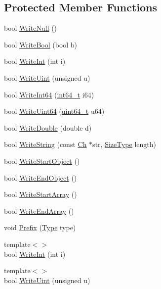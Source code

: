 \subsection*{Protected Member Functions}
\begin{DoxyCompactItemize}
\item 
bool \hyperlink{classWriter_af4f79d39ad69cbbc7976565dd257b436}{Write\+Null} ()
\item 
bool \hyperlink{classWriter_a21f1adc6a520084ed4f39522ed9f4540}{Write\+Bool} (bool b)
\item 
bool \hyperlink{classWriter_acc42b38b43ae1488fc2e779c8a333d34}{Write\+Int} (int i)
\item 
bool \hyperlink{classWriter_aa7e4196f87bfa66c9619e0efd15d16ea}{Write\+Uint} (unsigned u)
\item 
bool \hyperlink{classWriter_ad68f4e0a85cc944a0740200544c97ed9}{Write\+Int64} (\hyperlink{stdint_8h_a414156feea104f8f75b4ed9e3121b2f6}{int64\+\_\+t} i64)
\item 
bool \hyperlink{classWriter_ac3d17e9409c202e39b0cd887545783d6}{Write\+Uint64} (\hyperlink{stdint_8h_aec6fcb673ff035718c238c8c9d544c47}{uint64\+\_\+t} u64)
\item 
bool \hyperlink{classWriter_aced9cb2b88abc16c4a0bdb75920cd424}{Write\+Double} (double d)
\item 
bool \hyperlink{classWriter_aab4926d061472149998b89b4d34e1a4b}{Write\+String} (const \hyperlink{classWriter_a5ba0d623162839460024b517fc2d5868}{Ch} $\ast$str, \hyperlink{rapidjson_8h_a5ed6e6e67250fadbd041127e6386dcb5}{Size\+Type} length)
\item 
bool \hyperlink{classWriter_ad3578f94664c62e6b0773f4dc0567a17}{Write\+Start\+Object} ()
\item 
bool \hyperlink{classWriter_a9f76fcffaf403a49a311de074a23de2d}{Write\+End\+Object} ()
\item 
bool \hyperlink{classWriter_af3804bde535cf36e0733c07a56742111}{Write\+Start\+Array} ()
\item 
bool \hyperlink{classWriter_a9d7ec17cfb0b64a88c009871ba741f52}{Write\+End\+Array} ()
\item 
void \hyperlink{classWriter_ad56f2e953b7919ad2157a2fc2bedf873}{Prefix} (\hyperlink{rapidjson_8h_a1d1cfd8ffb84e947f82999c682b666a7}{Type} type)
\item 
{\footnotesize template$<$$>$ }\\bool \hyperlink{classWriter_abefb163a93b376d056edecad5a7a82ef}{Write\+Int} (int i)
\item 
{\footnotesize template$<$$>$ }\\bool \hyperlink{classWriter_a9665a4a1549b286944b21927b80060cf}{Write\+Uint} (unsigned u)

\end{DoxyCompactItemize}
